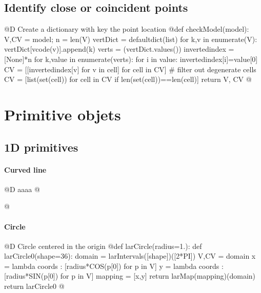 \documentclass[11pt,oneside]{article}	%
\begin{document}
\subsection{Identify close or coincident points}

@D Create a dictionary with key the point location
@{def checkModel(model):
	V,CV = model; n = len(V)
	vertDict = defaultdict(list)
	for k,v in enumerate(V): vertDict[vcode(v)].append(k) 
	verts = (vertDict.values())
	invertedindex = [None]*n
	for k,value in enumerate(verts):
		for i in value:
			invertedindex[i]=value[0]	
	CV = [[invertedindex[v] for v in cell] for cell in CV]
	# filter out degenerate cells
	CV = [list(set(cell)) for cell in CV if len(set(cell))==len(cell)]
	return V, CV
@}


\section{Primitive objets}
\subsection{1D primitives}

\paragraph{Curved line}
@D aaaa
@{

@}

\paragraph{Circle}
@D Circle centered in the origin
@{def larCircle(radius=1.):
	def larCircle0(shape=36):
		domain = larIntervals([shape])([2*PI])
		V,CV = domain
		x = lambda coords : [radius*COS(p[0]) for p in V]
		y = lambda coords : [radius*SIN(p[0]) for p in V]
		mapping = [x,y]
		return larMap(mapping)(domain)
	return larCircle0
@}
\end{document}
